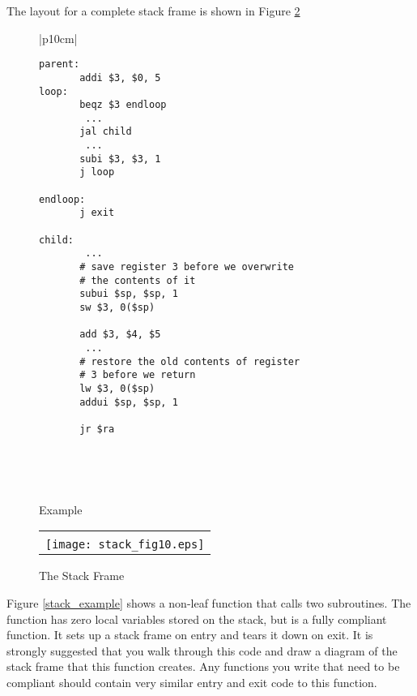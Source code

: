 The layout for a complete stack frame is shown in Figure \ref{stackframe}

%
%
\begin{figure}[!btp]

\begin{center}
\begin{tabular}{|p{10cm}|}
\hline
\begin{scriptsize}
\begin{verbatim}
parent:
       addi $3, $0, 5
loop:
       beqz $3 endloop
        ...
       jal child
        ...
       subi $3, $3, 1
       j loop

endloop:
       j exit

child:
        ...
       # save register 3 before we overwrite
       # the contents of it
       subui $sp, $sp, 1
       sw $3, 0($sp)

       add $3, $4, $5
        ...
       # restore the old contents of register
       # 3 before we return
       lw $3, 0($sp)
       addui $sp, $sp, 1

       jr $ra
\end{verbatim}
\end{scriptsize}
\\
\hline
\end{tabular}
\end{center}
\

\caption{Example}
\label{fig:paramexample}
\end{figure}


\begin{figure}[!hbtp]
\begin{footnotesize}
\begin{center}
\begin{tabular}{|p{8cm}|}
\hline
\\
\texttt{[image: stack\_fig10.eps]}

\\
\hline
\end{tabular}
\end{center}
\end{footnotesize}

\caption{The Stack Frame}
\label{stackframe}
\end{figure}

Figure \ref{stack_example} shows a non-leaf function that calls two
subroutines. The function has zero local variables stored on the
stack, but is a fully compliant function. It sets up a stack frame on
entry and tears it down on exit. It is strongly suggested that you
walk through this code and draw a diagram of the stack frame that this
function creates. Any functions you write that need to be compliant
should contain very similar entry and exit code to this function.

